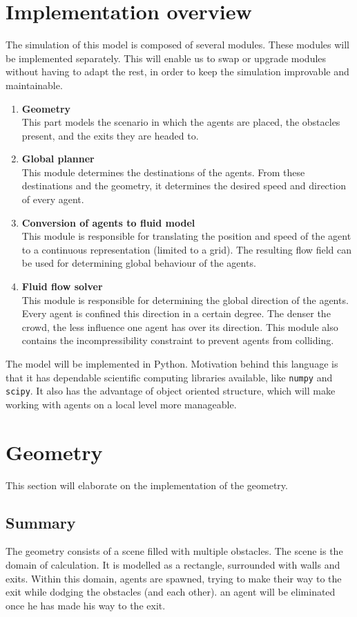 \documentclass{article}
\begin{document}
\section{Implementation overview}
The simulation of this model is composed of several modules. These modules will be implemented separately. This will enable us to swap or upgrade modules without having to adapt the rest, in order to keep the simulation improvable and maintainable.
\begin{enumerate}
\item \textbf{Geometry}\\
This part models the scenario in which the agents are placed, the obstacles present, and the exits they are headed to.
\item \textbf{Global planner}\\
This module determines the destinations of the agents. From these destinations and the geometry, it determines the desired speed and direction of every agent.
\item \textbf{Conversion of agents to fluid model}\\
This module is responsible for translating the position and speed of the agent to a continuous representation (limited to a grid). The resulting flow field can be used for determining global behaviour of the agents.
\item \textbf{Fluid flow solver}\\
This module is responsible for determining the global direction of the agents. Every agent is confined this direction in a certain degree. The denser the crowd, the less influence one agent has over its direction.
This module also contains the incompressibility constraint to prevent agents from colliding.
\end{enumerate}
The model will be implemented in Python. Motivation behind this language is that it has dependable scientific computing libraries available, like \texttt{numpy} and \texttt{scipy}. It also has the advantage of object oriented structure, which will make working with agents on a local level more manageable.
\newpage
\section{Geometry}
This section will elaborate on the implementation of the geometry.
\subsection{Summary}
The geometry consists of a scene filled with multiple obstacles. The scene is the domain of calculation. It is modelled as a rectangle, surrounded with walls and exits. Within this domain, agents are spawned, trying to make their way to the exit while dodging the obstacles (and each other). an agent will be eliminated once he has made his way to the exit.
\end{document}
